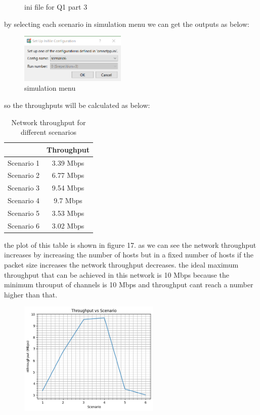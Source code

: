 \begin{qsolve}
\begin{qsolve}[]
\begin{figure}[H]
            \caption{ini file for Q1 part 3}
        \end{figure}
        \splitqsolve[\splitqsolve]
        by selecting each scenario in simulation menu we can get the outputs as below:
        \begin{figure}[H]
            \centering
            \includegraphics[width=0.45\textwidth]{output10.png}
            \caption{simulation menu}
        \end{figure}
        so the throughputs will be calculated as below:
        \begin{table}[H]
            \centering
            \begin{tabular}{|c|c|}
            \hline
             & Throughput \\
            \hline
            Scenario 1 &  3.39 Mbps\\
            \hline
            Scenario 2 &  6.77 Mbps\\
            \hline
            Scenario 3 &  9.54 Mbps\\
            \hline
            Scenario 4 &  9.7 Mbps\\
            \hline
            Scenario 5 &  3.53 Mbps\\
            \hline
            Scenario 6 &  3.02 Mbps\\
            \hline
            \end{tabular}
            \caption{Network throughput for different scenarios}
            \label{table:throughput}
        \end{table}
        the plot of this table is shown in figure 17. as we can see the network throughput increases by increasing the number of hosts but in a fixed number of hosts if the packet size increases the network throughput decreases. the ideal maximum throughput that can be achieved in this network is 10 Mbps because the minimum throuput of channels is 10 Mbps and throughput cant reach a number higher than that.
        \begin{figure}[H]
            \centering
            \includegraphics[width=0.6\textwidth]{output11.png}

\end{figure}
\end{qsolve}
\end{qsolve}
